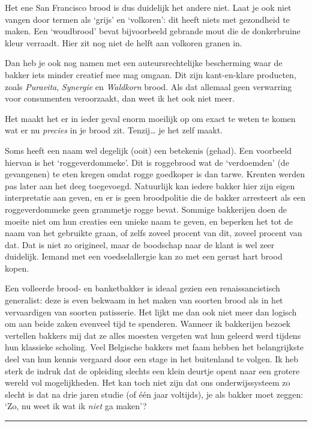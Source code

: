 \documentclass[
  11pt,
  dutch,
]{memoir}
\begin{document}
Het ene San Francisco brood is dus duidelijk het andere niet. Laat je
ook niet vangen door termen als `grijs' en `volkoren': dit heeft niets
met gezondheid te maken. Een `woudbrood' bevat bijvoorbeeld gebrande
mout die de donkerbruine kleur verraadt. Hier zit nog niet de helft aan
volkoren granen in.

Dan heb je ook nog namen met een auteursrechtelijke bescherming waar de
bakker iets minder creatief mee mag omgaan. Dit zijn kant-en-klare
producten, zoals \emph{Puravita}, \emph{Synergie} en \emph{Waldkorn}
brood. Als dat allemaal geen verwarring voor consumenten veroorzaakt,
dan weet ik het ook niet meer.

Het maakt het er in ieder geval enorm moeilijk op om exact te weten te
komen wat er nu \emph{precies} in je brood zit. Tenzij\ldots{} je het
zelf maakt.

Soms heeft een naam wel degelijk (ooit) een betekenis (gehad). Een
voorbeeld hiervan is het `roggeverdommeke'. Dit is roggebrood wat de
`verdoemden' (de gevangenen) te eten kregen omdat rogge goedkoper is dan
tarwe. Krenten werden pas later aan het deeg toegevoegd. Natuurlijk kan
iedere bakker hier zijn eigen interpretatie aan geven, en er is geen
broodpolitie die de bakker arresteert als een roggeverdommeke geen
grammetje rogge bevat. Sommige bakkerijen doen de moeite niet om hun
creaties een unieke naam te geven, en beperken het tot de naam van het
gebruikte graan, of zelfs zoveel procent van dit, zoveel procent van
dat. Dat is niet zo origineel, maar de boodschap naar de klant is wel
zeer duidelijk. Iemand met een voedselallergie kan zo met een gerust
hart brood kopen.

Een volleerde brood- en banketbakker is ideaal gezien een
renaissancistisch generalist: deze is even bekwaam in het maken van
soorten brood als in het vervaardigen van soorten patisserie. Het lijkt
me dan ook niet meer dan logisch om aan beide zaken evenveel tijd te
spenderen. Wanneer ik bakkerijen bezoek vertellen bakkers mij dat ze
alles moesten vergeten wat hun geleerd werd tijdens hun klassieke
scholing. Veel Belgische bakkers met faam hebben het belangrijkste deel
van hun kennis vergaard door een stage in het buitenland te volgen. Ik
heb sterk de indruk dat de opleiding slechts een klein deurtje opent
naar een grotere wereld vol mogelijkheden. Het kan toch niet zijn dat
ons onderwijssysteem zo slecht is dat na drie jaren studie (of één jaar
voltijds), je als bakker moet zeggen: `Zo, nu weet ik wat ik \emph{niet}
ga maken'?

\pfbreak
\end{document}
